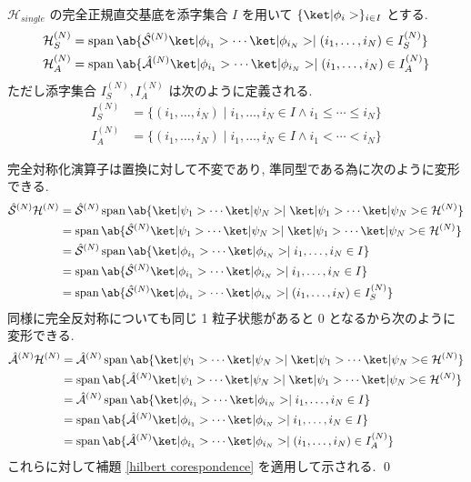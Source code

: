 \documentclass[uplatex,dvipdfmx,a4paper,11pt]{jlreq}
\makeatletter
\DeclareMathOperator{\Span}{span}
\newcommand{\HH}{\mathcal{H}}
\renewcommand{\S}{\mathcal{S}}
\newcommand{\A}{\mathcal{A}}
\numberwithin{equation}{section}
\theoremstyle{definition}
\renewenvironment{proof}[1][\proofname]{\par
  \normalfont
  \topsep6\p@\@plus6\p@ \trivlist
  \item[\hskip\labelsep{\bfseries #1}\@addpunct{\bfseries}]\ignorespaces\quad\par
}{%
  \qed\endtrivlist\@endpefalse
}
\renewcommand\proofname{証明}
\makeatother
\begin{document}
\begin{proposition}[Q21-16(i)(ii), Q21-17(i)(ii), Q21-18(i)(ii)]
  $\HH_{single}$ の完全正規直交基底を添字集合 $I$ を用いて $\{\ket|\phi_i>\}_{i\in I}$ とする.
  \begin{align}
    \HH_S^{(N)} & = \Span\ab\{\hat{\S}^{(N)}\ket|\phi_{i_1}>\cdots\ket|\phi_{i_N}> \mid (i_1,\ldots,i_N)\in I_S^{(N)} \} \\
    \HH_A^{(N)} & = \Span\ab\{\hat{\A}^{(N)}\ket|\phi_{i_1}>\cdots\ket|\phi_{i_N}> \mid (i_1,\ldots,i_N)\in I_A^{(N)} \}
  \end{align}
  ただし添字集合 $I_S^{(N)}, I_A^{(N)}$ は次のように定義される.
  \begin{align}
    I_S^{(N)} & = \{(i_1,\ldots,i_N)\mid i_1,\ldots,i_N\in I\land i_1\leq\cdots\leq i_{N}\} \\
    I_A^{(N)} & = \{(i_1,\ldots,i_N)\mid i_1,\ldots,i_N\in I\land i_1<\cdots<i_{N}\}
  \end{align}
\end{proposition}
\begin{proof}
  完全対称化演算子は置換に対して不変であり, 準同型である為に次のように変形できる.
  \begin{align}
    \hat{\S}^{(N)}\HH^{(N)} & = \hat{\S}^{(N)}\Span\ab\{\ket|\psi_1>\cdots\ket|\psi_N> \mid \ket|\psi_1>\cdots\ket|\psi_N>\in\HH^{(N)} \} \\
                            & = \Span\ab\{\hat{\S}^{(N)}\ket|\psi_1>\cdots\ket|\psi_N> \mid \ket|\psi_1>\cdots\ket|\psi_N>\in\HH^{(N)} \} \\
                            & = \hat{\S}^{(N)}\Span\ab\{\ket|\phi_{i_1}>\cdots\ket|\phi_{i_N}> \mid i_1,\ldots,i_N\in I\}                 \\
                            & = \Span\ab\{\hat{\S}^{(N)}\ket|\phi_{i_1}>\cdots\ket|\phi_{i_N}> \mid i_1,\ldots,i_N\in I\}                 \\
                            & = \Span\ab\{\hat{\S}^{(N)}\ket|\phi_{i_1}>\cdots\ket|\phi_{i_N}> \mid (i_1,\ldots,i_N)\in I_S^{(N)} \}
  \end{align}
  同様に完全反対称についても同じ 1 粒子状態があると 0 となるから次のように変形できる.
  \begin{align}
    \hat{\A}^{(N)}\HH^{(N)} & = \hat{\A}^{(N)}\Span\ab\{\ket|\psi_1>\cdots\ket|\psi_N> \mid \ket|\psi_1>\cdots\ket|\psi_N>\in\HH^{(N)} \} \\
                            & = \Span\ab\{\hat{\A}^{(N)}\ket|\psi_1>\cdots\ket|\psi_N> \mid \ket|\psi_1>\cdots\ket|\psi_N>\in\HH^{(N)} \} \\
                            & = \hat{\A}^{(N)}\Span\ab\{\ket|\phi_{i_1}>\cdots\ket|\phi_{i_N}> \mid i_1,\ldots,i_N\in I \}                \\
                            & = \Span\ab\{\hat{\A}^{(N)}\ket|\phi_{i_1}>\cdots\ket|\phi_{i_N}> \mid i_1,\ldots,i_N\in I \}                \\
                            & = \Span\ab\{\hat{\A}^{(N)}\ket|\phi_{i_1}>\cdots\ket|\phi_{i_N}> \mid (i_1,\ldots,i_N)\in I_A^{(N)} \}
  \end{align}
  これらに対して補題 \ref{hilbert corespondence} を適用して示される.
\end{proof}
\end{document}
